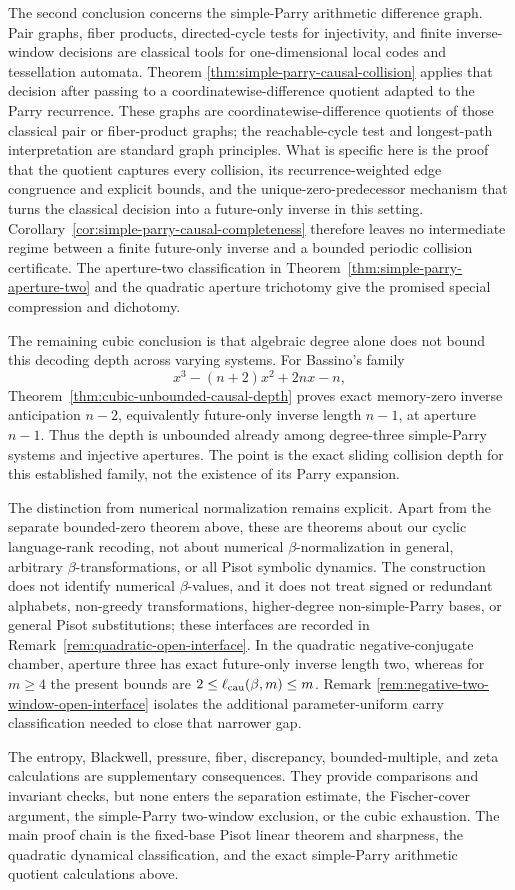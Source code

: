 The second conclusion concerns the simple-Parry arithmetic difference graph.
Pair graphs, fiber products, directed-cycle tests for injectivity, and finite
inverse-window decisions are classical tools for one-dimensional local codes
and tessellation automata.  Theorem
\ref{thm:simple-parry-causal-collision} applies that decision after passing
to a coordinatewise-difference quotient adapted to the Parry recurrence.
These graphs are coordinatewise-difference quotients of those classical
pair or fiber-product graphs; the reachable-cycle test and longest-path
interpretation are standard graph principles.  What is specific here is the
proof that the quotient captures every collision, its recurrence-weighted
edge congruence and explicit bounds, and the unique-zero-predecessor mechanism
that turns the classical decision into a future-only inverse in this setting.
Corollary~\ref{cor:simple-parry-causal-completeness} therefore leaves no
intermediate regime between a finite future-only inverse and a bounded
periodic collision certificate.  The aperture-two classification in
Theorem~\ref{thm:simple-parry-aperture-two} and the quadratic aperture
trichotomy give the promised special compression and dichotomy.

The remaining cubic conclusion is that algebraic degree alone does not bound
this decoding depth across varying systems.  For Bassino's family
\[
 x^3-(n+2)x^2+2nx-n,
\]
Theorem~\ref{thm:cubic-unbounded-causal-depth} proves exact memory-zero
inverse anticipation $n-2$, equivalently future-only inverse length $n-1$, at aperture
$n-1$.  Thus the depth is unbounded already among degree-three simple-Parry
systems and injective apertures.  The point is the exact sliding collision
depth for this established family, not the existence of its Parry expansion.

The distinction from numerical normalization remains explicit.  Apart from
the separate bounded-zero theorem above, these are theorems about our cyclic
language-rank recoding, not about numerical
$\beta$-normalization in general, arbitrary $\beta$-transformations, or all
Pisot symbolic dynamics.  The construction does not identify numerical
$\beta$-values, and it does not treat signed or redundant alphabets,
non-greedy transformations, higher-degree non-simple-Parry bases, or general
Pisot substitutions; these
interfaces are recorded in Remark~\ref{rem:quadratic-open-interface}.  In the
quadratic negative-conjugate chamber, aperture three has exact future-only inverse length
two, whereas for $m\ge4$ the present bounds are
$2\le\ell_{\rm cau}(\beta,m)\le m$.  Remark
\ref{rem:negative-two-window-open-interface} isolates the additional
parameter-uniform carry classification needed to close that narrower gap.

The entropy, Blackwell, pressure, fiber, discrepancy, bounded-multiple, and
zeta calculations are supplementary consequences.
They provide comparisons and invariant checks, but none enters the
separation estimate, the Fischer-cover argument, the simple-Parry
two-window exclusion, or the cubic exhaustion.  The main proof chain is the
fixed-base Pisot linear theorem and sharpness, the quadratic dynamical
classification, and the exact simple-Parry arithmetic quotient calculations
above.
